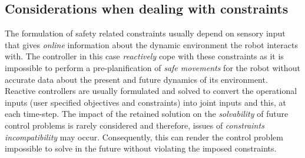 \subsection{Considerations when dealing with constraints}
The formulation of safety related constraints usually depend on sensory input that gives \textit{online} information about the dynamic environment the robot interacts with. The controller in this case \textit{reactively} cope with these constraints as it is impossible to perform a pre-planification of \textit{safe movements} for the robot without accurate data about the present and future dynamics of its environment. \\
Reactive controllers are usually formulated and solved to convert the operational inputs (user specified objectives and constraints) into joint inputs and this, at each time-step. The impact of the retained solution on the \textit{solvability} of future control problems is rarely considered and therefore, issues of \textit{constraints incompatibility} may occur. Consequently, this can render the control problem impossible to solve in the future without violating the imposed constraints. \\

